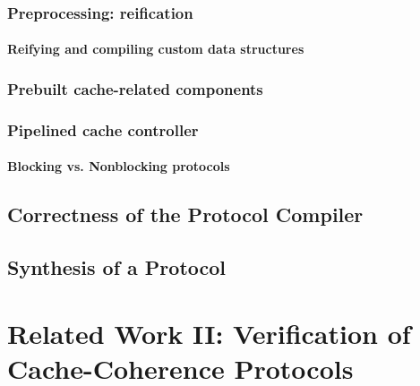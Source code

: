 \subsection{Preprocessing: reification}

\subsubsection{Reifying and compiling custom data structures}

\subsection{Prebuilt cache-related components}

\subsection{Pipelined cache controller}

\subsubsection{Blocking vs. Nonblocking protocols}

\section{Correctness of the Protocol Compiler}
\label{sec-compiler-correctness}

\section{Synthesis of a \hemiola{} Protocol}
\label{sec-synthesis}

\chapter{Related Work II: Verification of Cache-Coherence Protocols}
